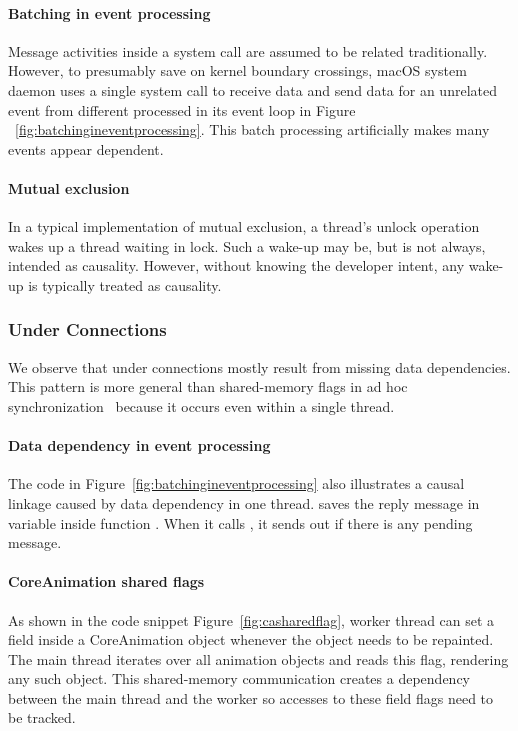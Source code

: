 \paragraph{Batching in event processing}

Message activities inside a system call are assumed to be related traditionally.
However, to presumably save on kernel boundary crossings, macOS system daemon
 uses a single system call to receive data and send data for
an unrelated event from different processed in its event loop in Figure
~\ref{fig:batchingineventprocessing}. This batch processing artificially makes
many events appear dependent.

\paragraph{Mutual exclusion}

In a typical implementation of mutual exclusion, a thread's unlock operation
wakes up a thread waiting in lock. Such a wake-up may be, but is not always,
intended as causality. However, without knowing the developer intent, any
wake-up is typically treated as causality. 

\subsubsection{Under Connections}\label{subsec:underconnections}

We observe that under connections mostly result from missing data
dependencies.  This pattern is more general than shared-memory flags in ad
hoc synchronization~\cite{xiong2010ad} because it occurs even within a
single thread. 

\paragraph{Data dependency in event processing}
The code in Figure~\ref{fig:batchingineventprocessing} also illustrates a causal
linkage caused by data dependency in one thread.  saves the reply
message in variable  inside function .
When it calls , it sends out  if there is
any pending message.

\paragraph{CoreAnimation shared flags}
As shown in the code snippet Figure~\ref{fig:casharedflag}, worker thread can set a
field  inside a CoreAnimation object whenever the object needs
to be repainted. The main thread iterates over all animation objects and reads
this flag, rendering any such object. This shared-memory communication creates
a dependency between the main thread and the worker so accesses to these field
flags need to be tracked.

